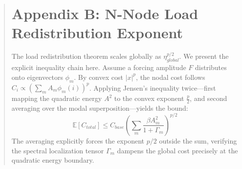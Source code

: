 \documentclass[11pt]{article}
\newcommand{\EE}{\mathbb{E}}
\begin{document}
\begin{abstract}
\section*{Appendix B: N-Node Load Redistribution Exponent}
The load redistribution theorem scales globally as $\eta_{global}^{p/2}$. We present the explicit inequality chain here. Assume a forcing amplitude $F$ distributes onto eigenvectors $\phi_m$. By convex cost $|x|^p$, the nodal cost follows $C_i \propto (\sum_m A_m \phi_m(i))^p$.
Applying Jensen's inequality twice---first mapping the quadratic energy $A^2$ to the convex exponent $\frac{p}{2}$, and second averaging over the modal superposition---yields the bound:
\begin{equation}
\EE [C_{total}] \le C_{base} \left( \sum_{m} \frac{\beta A_m^2}{1 + \Gamma_m} \right)^{p/2}
\end{equation}
The averaging explicitly forces the exponent $p/2$ outside the sum, verifying the spectral localization tensor $\Gamma_m$ dampens the global cost precisely at the quadratic energy boundary.


\end{abstract}
\end{document}
